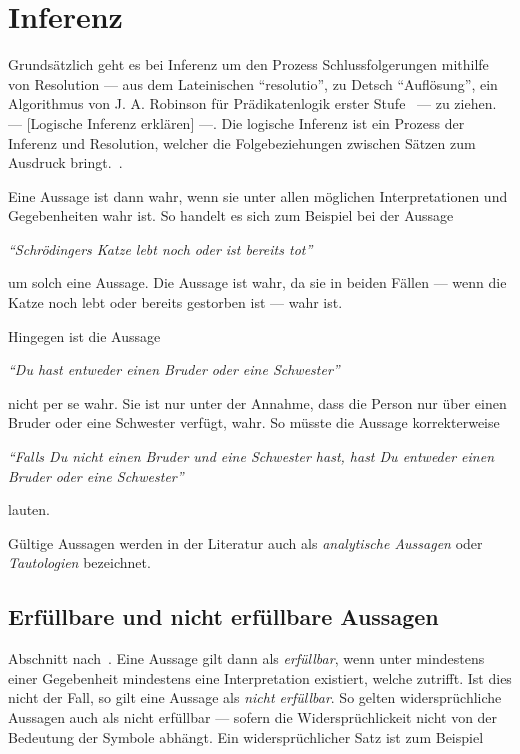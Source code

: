 \chapter{Inferenz}
\label{chap:inferenz}

Grundsätzlich geht es bei Inferenz um den Prozess Schlussfolgerungen mithilfe von Resolution --- aus dem Lateinischen ``resolutio'', zu Detsch ``Auflösung'', ein Algorithmus von J. A. Robinson für Prädikatenlogik erster Stufe~\cite[S. 18]{russel} --- zu ziehen. --- [Logische Inferenz erklären] ---. Die logische Inferenz ist ein Prozess der Inferenz und Resolution, welcher die Folgebeziehungen zwischen Sätzen zum Ausdruck bringt.~\cite[S. 163]{russel}.

Eine Aussage ist dann wahr, wenn sie unter allen möglichen Interpretationen und Gegebenheiten wahr ist. So handelt es sich zum Beispiel bei der Aussage

\noindent\hspace*{12mm}\textit{``Schrödingers Katze lebt noch oder ist bereits tot''}

um solch eine Aussage. Die Aussage ist wahr, da sie in beiden Fällen --- wenn die Katze noch lebt oder bereits gestorben ist --- wahr ist.

Hingegen ist die Aussage

\noindent\hspace*{12mm}\textit{``Du hast entweder einen Bruder oder eine Schwester''}

nicht per se wahr. Sie ist nur unter der Annahme, dass die Person nur über einen Bruder oder eine Schwester verfügt, wahr. So müsste die Aussage korrekterweise

\noindent\hspace*{12mm}\textit{``Falls Du nicht einen Bruder und eine Schwester hast, hast Du entweder einen Bruder oder eine Schwester''}

lauten.

Gültige Aussagen werden in der Literatur auch als \textit{analytische Aussagen} oder \textit{Tautologien} bezeichnet.~\cite[S. 164]{russel}

\section{Erfüllbare und nicht erfüllbare Aussagen}
\label{sec:erfüllbar-nicht-erfüllbar}

Abschnitt nach~\cite[S. 164]{russel}.
Eine Aussage gilt dann als \textit{erfüllbar}, wenn unter mindestens einer Gegebenheit mindestens eine Interpretation existiert, welche zutrifft. Ist dies nicht der Fall, so gilt eine Aussage als \textit{nicht erfüllbar}. So gelten widersprüchliche 
Aussagen auch als nicht erfüllbar --- sofern die Widersprüchlickeit nicht von der Bedeutung der Symbole abhängt. Ein widersprüchlicher Satz ist zum Beispiel

